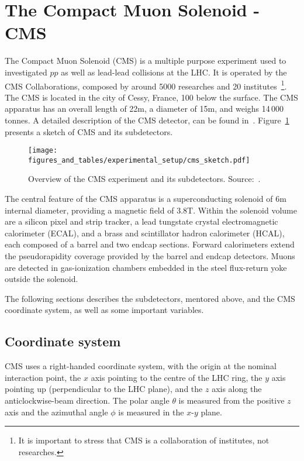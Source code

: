 
\section{The Compact Muon Solenoid - CMS}

The Compact Muon Solenoid (CMS) is a multiple purpose experiment used to investigated $pp$ as well as lead-lead collisions at the LHC. It is operated by the CMS Collaborations, composed by around 5000 researches and 20 institutes~\footnote{It is important to stress that CMS is a collaboration of institutes, not researches.}. The CMS is located in the city of Cessy, France, 100 below the surface. The CMS apparatus has an overall length of 22\unit{m}, a diameter of 15\unit{m}, and weighs 14\,000 \unit{tonnes}. A detailed description of the CMS detector, can be found in~\cite{Chatrchyan:2008zzk}. Figure~\ref{cms_sketch} presents a sketch of CMS and its subdetectors.

\begin{figure}[htbp]
    \centering
    \texttt{[image: figures\_and\_tables/experimental\_setup/cms\_sketch.pdf]}
    \caption{Overview of the CMS experiment and its subdetectors. Source:~\cite{Sakuma:2665537}.}
    \label{cms_sketch}
\end{figure}

The central feature of the CMS apparatus is a superconducting solenoid of 6\unit{m} internal diameter, providing a magnetic field of 3.8\unit{T}. Within the solenoid volume are a silicon pixel and strip tracker, a lead tungstate crystal electromagnetic calorimeter (ECAL), and a brass and scintillator hadron calorimeter (HCAL), each composed of a barrel and two endcap sections. Forward calorimeters extend the pseudorapidity coverage provided by the barrel and endcap detectors. Muons are detected in gas-ionization chambers embedded in the steel flux-return yoke outside the solenoid.  

The following sections describes the subdetectors, mentored above, and the CMS coordinate system, as well as some important variables.


\subsection{Coordinate system}

CMS uses a right-handed coordinate system, with the origin at the nominal interaction point, the $x$ axis pointing to the centre of the LHC ring, the $y$ axis pointing up (perpendicular to the LHC plane), and the $z$ axis along the anticlockwise-beam direction. The polar angle $\theta$ is measured from the positive $z$ axis and the azimuthal angle $\phi$ is measured in the $x$-$y$ plane.

